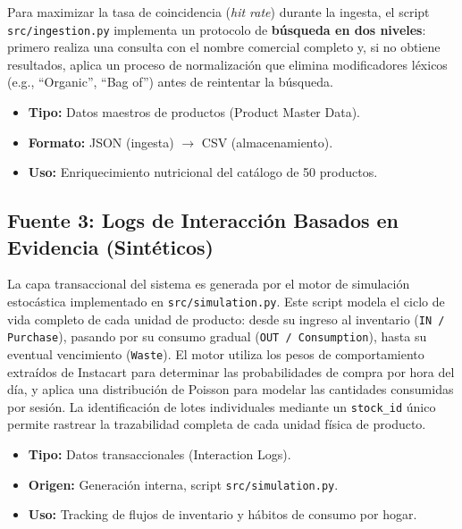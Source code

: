 \documentclass[12pt,a4paper]{article}
\newcommand{\code}[1]{\texttt{\small #1}}
\begin{document}
Para maximizar la tasa de coincidencia (\textit{hit rate}) durante la ingesta, el script \code{src/ingestion.py} implementa un protocolo de \textbf{búsqueda en dos niveles}: primero realiza una consulta con el nombre comercial completo y, si no obtiene resultados, aplica un proceso de normalización que elimina modificadores léxicos (e.g., ``Organic'', ``Bag of'') antes de reintentar la búsqueda.

\begin{itemize}
    \item \textbf{Tipo:} Datos maestros de productos (Product Master Data).
    \item \textbf{Formato:} JSON (ingesta) $\rightarrow$ CSV (almacenamiento).
    \item \textbf{Uso:} Enriquecimiento nutricional del catálogo de 50 productos.
\end{itemize}

\subsection{Fuente 3: Logs de Interacción Basados en Evidencia (Sintéticos)}

La capa transaccional del sistema es generada por el motor de simulación estocástica implementado en \code{src/simulation.py}. Este script modela el ciclo de vida completo de cada unidad de producto: desde su ingreso al inventario (\code{IN / Purchase}), pasando por su consumo gradual (\code{OUT / Consumption}), hasta su eventual vencimiento (\code{Waste}). El motor utiliza los pesos de comportamiento extraídos de Instacart para determinar las probabilidades de compra por hora del día, y aplica una distribución de Poisson para modelar las cantidades consumidas por sesión. La identificación de lotes individuales mediante un \code{stock\_id} único permite rastrear la trazabilidad completa de cada unidad física de producto.

\begin{itemize}
    \item \textbf{Tipo:} Datos transaccionales (Interaction Logs).
    \item \textbf{Origen:} Generación interna, script \code{src/simulation.py}.
    \item \textbf{Uso:} Tracking de flujos de inventario y hábitos de consumo por hogar.
\end{itemize}

\end{document}
